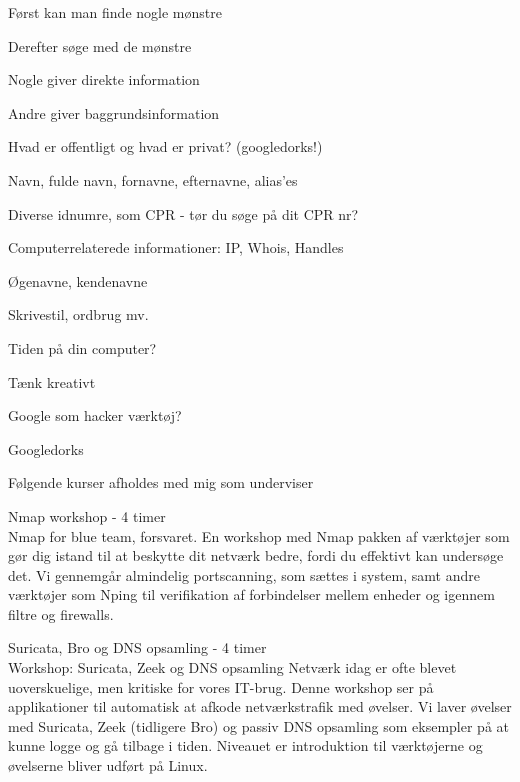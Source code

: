 \documentclass[Screen16to9,17pt]{foils}
\begin{document}

\begin{list1}
\item Først kan man finde nogle mønstre
\item Derefter søge med de mønstre
\item Nogle giver direkte information
\item Andre giver baggrundsinformation
\item Hvad er offentligt og hvad er privat? (googledorks!)
\begin{list2}
\item Navn, fulde navn, fornavne, efternavne, alias'es
\item Diverse idnumre, som CPR - tør du søge på dit CPR nr?
\item Computerrelaterede informationer: IP, Whois, Handles
\item Øgenavne, kendenavne
\item Skrivestil, ordbrug mv.
\item Tiden på din computer?
\item Tænk kreativt \smiley
\end{list2}
\end{list1}



\begin{list1}
\item Google som hacker værktøj?
\item Googledorks
\end{list1}


\myquestionspage



\begin{list1}
\item Følgende kurser afholdes med mig som underviser
\begin{list2}
\item Nmap workshop - 4 timer\\
Nmap for blue team, forsvaret.
En workshop med Nmap pakken af værktøjer som gør dig istand til at beskytte dit netværk bedre, fordi du effektivt kan undersøge det.
Vi gennemgår almindelig portscanning, som sættes i system, samt andre værktøjer som Nping til verifikation af forbindelser mellem enheder og igennem filtre og firewalls.
\vskip 1cm
\item Suricata, Bro og DNS opsamling - 4 timer\\
Workshop: Suricata, Zeek og DNS opsamling
Netværk idag er ofte blevet uoverskuelige, men kritiske for vores IT-brug. Denne workshop ser på applikationer til automatisk at afkode netværkstrafik med øvelser. Vi laver øvelser med Suricata, Zeek (tidligere Bro) og passiv DNS opsamling som eksempler på at kunne logge og gå tilbage i tiden. Niveauet er introduktion til værktøjerne og øvelserne bliver udført på Linux.
\end{list2}
\end{list1}
\end{document}
